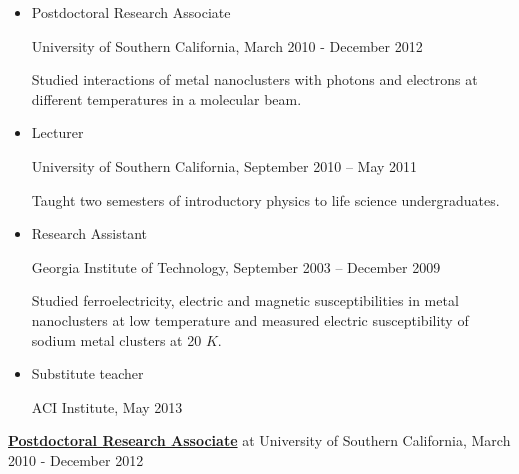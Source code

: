 \documentclass{sebase}
\begin{document}
\begin{itemize}
\item Postdoctoral Research Associate

\quad University of Southern California, March 2010 - December 2012

\quad \quad \quad \quad Studied interactions of metal nanoclusters with
photons and electrons at different temperatures in a molecular beam.

\item Lecturer

\quad University of Southern California, September 2010 -- May 2011

\quad \quad \quad \quad Taught two semesters of introductory physics to life
science undergraduates.

\item Research Assistant

\quad Georgia Institute of Technology, September 2003 -- December 2009

\quad \quad \quad \quad Studied ferroelectricity, electric and magnetic
susceptibilities in metal nanoclusters at low temperature and measured
electric susceptibility of sodium metal clusters at 20 $\unit{K}$.

\item Substitute teacher

\qquad ACI Institute, May 2013
\end{itemize}

\bigskip


\begin{description}
\item \quad \underline{\textbf{Postdoctoral Research Associate}} 
{\normalsize at University of Southern California, March 2010 - December 2012%
}
\end{description}
\end{document}
